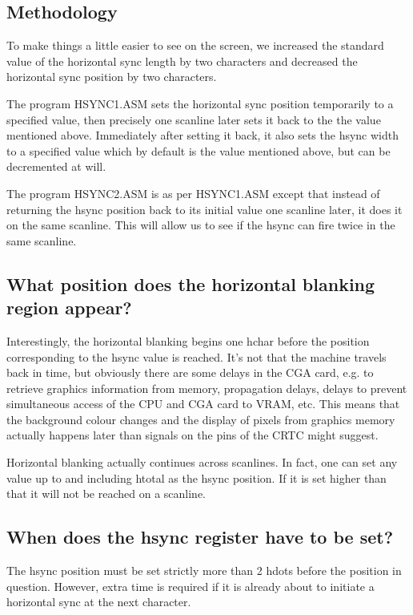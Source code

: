 \documentclass[a4paper,10pt]{amsart}
\begin{document}
\subsection{Methodology}

To make things a little easier to see on the screen, we increased the
standard value of the horizontal sync length by two characters and decreased
the horizontal sync position by two characters.

The program HSYNC1.ASM sets the horizontal sync position temporarily to a
specified value, then precisely one scanline later sets it back to the the
value mentioned above. Immediately after setting it back, it also sets the
hsync width to a specified value which by default is the value mentioned above,
but can be decremented at will.

The program HSYNC2.ASM is as per HSYNC1.ASM except that instead of returning
the hsync position back to its initial value one scanline later, it does it
on the same scanline. This will allow us to see if the hsync can fire twice in
the same scanline.

\subsection{What position does the horizontal blanking region appear?}

Interestingly, the horizontal blanking begins one hchar before the position
corresponding to the hsync value is reached. It's not that the machine travels
back in time, but obviously there are some delays in the CGA card, e.g. to
retrieve graphics information from memory, propagation delays, delays to
prevent simultaneous access of the CPU and CGA card to VRAM, etc. This means
that the background colour changes and the display of pixels from graphics
memory actually happens later than signals on the pins of the CRTC might
suggest.

Horizontal blanking actually continues across scanlines. In fact, one can set
any value up to and including htotal as the hsync position. If it is set higher
than that it will not be reached on a scanline.

\subsection{When does the hsync register have to be set?}

The hsync position must be set strictly more than 2 hdots before the position
in question. However, extra time is required if it is already about to initiate
a horizontal sync at the next character.
\end{document}
